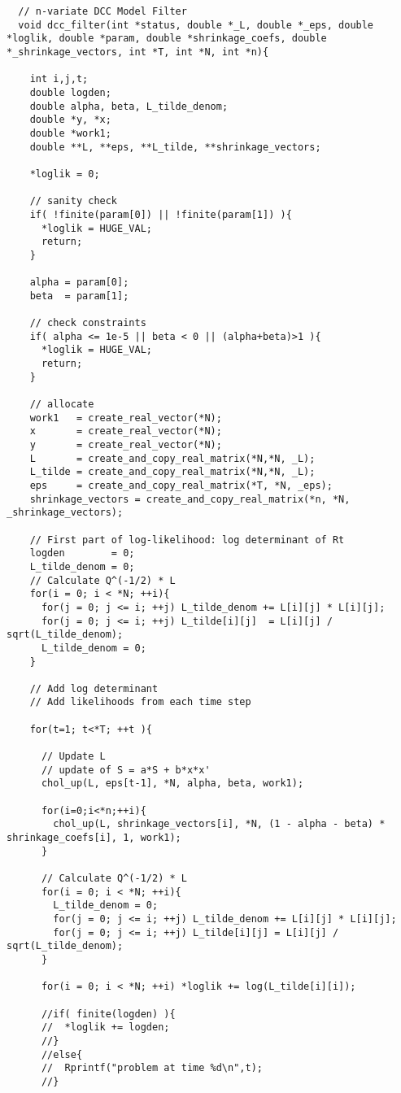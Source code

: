 \begin{lstlisting}
  // n-variate DCC Model Filter
  void dcc_filter(int *status, double *_L, double *_eps, double *loglik, double *param, double *shrinkage_coefs, double *_shrinkage_vectors, int *T, int *N, int *n){

    int i,j,t;
    double logden;
    double alpha, beta, L_tilde_denom;
    double *y, *x;
    double *work1;
    double **L, **eps, **L_tilde, **shrinkage_vectors;

    *loglik = 0;

    // sanity check
    if( !finite(param[0]) || !finite(param[1]) ){
      *loglik = HUGE_VAL;
      return;
    }

    alpha = param[0];
    beta  = param[1];

    // check constraints
    if( alpha <= 1e-5 || beta < 0 || (alpha+beta)>1 ){
      *loglik = HUGE_VAL;
      return;
    }

    // allocate
    work1   = create_real_vector(*N);
    x       = create_real_vector(*N);
    y       = create_real_vector(*N);
    L       = create_and_copy_real_matrix(*N,*N, _L);
    L_tilde = create_and_copy_real_matrix(*N,*N, _L);
    eps     = create_and_copy_real_matrix(*T, *N, _eps);
    shrinkage_vectors = create_and_copy_real_matrix(*n, *N, _shrinkage_vectors);

    // First part of log-likelihood: log determinant of Rt
    logden        = 0;
    L_tilde_denom = 0;
    // Calculate Q^(-1/2) * L
    for(i = 0; i < *N; ++i){
      for(j = 0; j <= i; ++j) L_tilde_denom += L[i][j] * L[i][j];
      for(j = 0; j <= i; ++j) L_tilde[i][j]  = L[i][j] / sqrt(L_tilde_denom);
      L_tilde_denom = 0;
    }

    // Add log determinant
    // Add likelihoods from each time step

    for(t=1; t<*T; ++t ){

      // Update L
      // update of S = a*S + b*x*x'
      chol_up(L, eps[t-1], *N, alpha, beta, work1);

      for(i=0;i<*n;++i){
        chol_up(L, shrinkage_vectors[i], *N, (1 - alpha - beta) * shrinkage_coefs[i], 1, work1);
      }

      // Calculate Q^(-1/2) * L
      for(i = 0; i < *N; ++i){
        L_tilde_denom = 0;
        for(j = 0; j <= i; ++j) L_tilde_denom += L[i][j] * L[i][j];
        for(j = 0; j <= i; ++j) L_tilde[i][j] = L[i][j] / sqrt(L_tilde_denom);
      }

      for(i = 0; i < *N; ++i) *loglik += log(L_tilde[i][i]);

      //if( finite(logden) ){
      //  *loglik += logden;
      //}
      //else{
      //  Rprintf("problem at time %d\n",t);
      //}


\end{lstlisting}
